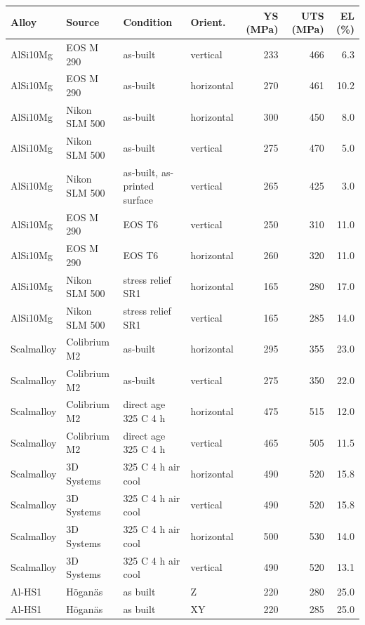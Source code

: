 \begin{tabular}{@{}llllrrr@{}}
\toprule
Alloy & Source & Condition & Orient. & YS (MPa) & UTS (MPa) & EL (\%) \\
\midrule
AlSi10Mg & EOS M 290~\cite{ds_eos} & as-built & vertical & 233 & 466 & 6.3 \\
AlSi10Mg & EOS M 290~\cite{ds_eos} & as-built & horizontal & 270 & 461 & 10.2 \\
AlSi10Mg & Nikon SLM 500~\cite{ds_nikon} & as-built & horizontal & 300 & 450 & 8.0 \\
AlSi10Mg & Nikon SLM 500~\cite{ds_nikon} & as-built & vertical & 275 & 470 & 5.0 \\
AlSi10Mg & Nikon SLM 500~\cite{ds_nikon} & as-built, as-printed surface & vertical & 265 & 425 & 3.0 \\
AlSi10Mg & EOS M 290~\cite{ds_eos} & EOS T6 & vertical & 250 & 310 & 11.0 \\
AlSi10Mg & EOS M 290~\cite{ds_eos} & EOS T6 & horizontal & 260 & 320 & 11.0 \\
AlSi10Mg & Nikon SLM 500~\cite{ds_nikon} & stress relief SR1 & horizontal & 165 & 280 & 17.0 \\
AlSi10Mg & Nikon SLM 500~\cite{ds_nikon} & stress relief SR1 & vertical & 165 & 285 & 14.0 \\
Scalmalloy & Colibrium M2~\cite{ds_colibrium} & as-built & horizontal & 295 & 355 & 23.0 \\
Scalmalloy & Colibrium M2~\cite{ds_colibrium} & as-built & vertical & 275 & 350 & 22.0 \\
Scalmalloy & Colibrium M2~\cite{ds_colibrium} & direct age 325 C 4 h & horizontal & 475 & 515 & 12.0 \\
Scalmalloy & Colibrium M2~\cite{ds_colibrium} & direct age 325 C 4 h & vertical & 465 & 505 & 11.5 \\
Scalmalloy & 3D Systems~\cite{ds_3dsystems} & 325 C 4 h air cool & horizontal & 490 & 520 & 15.8 \\
Scalmalloy & 3D Systems~\cite{ds_3dsystems} & 325 C 4 h air cool & vertical & 490 & 520 & 15.8 \\
Scalmalloy & 3D Systems~\cite{ds_3dsystems} & 325 C 4 h air cool & horizontal & 500 & 530 & 14.0 \\
Scalmalloy & 3D Systems~\cite{ds_3dsystems} & 325 C 4 h air cool & vertical & 490 & 520 & 13.1 \\
\midrule
Al-HS1 & H\"ogan\"as~\cite{ds_hoganas} & as built & Z & 220 & 280 & 25.0 \\
Al-HS1 & H\"ogan\"as~\cite{ds_hoganas} & as built & XY & 220 & 285 & 25.0 \\

\end{tabular}
